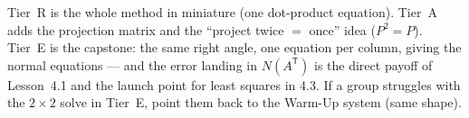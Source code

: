 \documentclass[10pt]{article}
\newcommand{\T}{\mathsf{T}}
\begin{document}
\begin{teachernote}
Tier~R is the whole method in miniature (one dot-product equation). Tier~A adds the projection matrix and
the ``project twice $=$ once'' idea ($P^2=P$). Tier~E is the capstone: the same right angle, one equation
per column, giving the normal equations --- and the error landing in $N(A^{\T})$ is the direct payoff of
Lesson~4.1 and the launch point for least squares in 4.3. If a group struggles with the $2\times2$ solve
in Tier~E, point them back to the Warm-Up system (same shape).
\end{teachernote}
\end{document}

